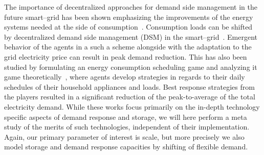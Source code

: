 \documentclass[conference]{IEEEtran}
\begin{document}
The importance of decentralized approaches for demand side management in the future smart--grid has been shown emphasizing the improvements of the energy systems needed at the side of consumption~\cite{palensky2011demand}. Consumption loads can be shifted by decentralized demand side management (DSM) in the smart--grid~\cite{Ramchurn2011a}. Emergent behavior of the agents in a such a scheme alongside with the adaptation to the grid electricity price can result in peak demand reduction. This has also been studied by formulating an energy consumption scheduling game and analyzing it game theoretically~\cite{Mohsenian-Rad2010}, where agents develop strategies in regards to their daily schedules of their household appliances and loads. Best response strategies from the players resulted in a significant reduction of the peak-to-average of the total electricity demand. 
While these works focus primarily on the in-depth technology specific aspects of demand response and storage, we will here perform a meta study of the merits of such technologies, independent of their implementation. Again, our primary parameter of interest is scale, but more precisely we also model storage and demand response capacities by shifting of flexible demand.
\end{document}
